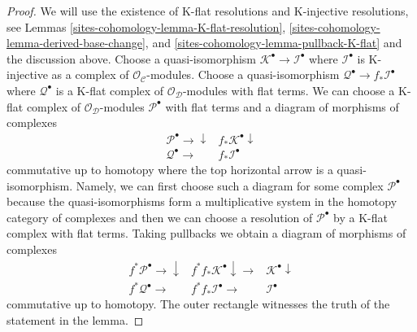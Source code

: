 \begin{proof}
We will use the existence of K-flat resolutions and
K-injective resolutions, see Lemmas
\ref{sites-cohomology-lemma-K-flat-resolution}, \ref{sites-cohomology-lemma-derived-base-change}, and
\ref{sites-cohomology-lemma-pullback-K-flat} and the discussion above.
Choose a quasi-isomorphism
$\mathcal{K}^\bullet \to \mathcal{I}^\bullet$ where $\mathcal{I}^\bullet$
is K-injective as a complex of $\mathcal{O}_\mathcal{C}$-modules.
Choose a quasi-isomorphism $\mathcal{Q}^\bullet \to f_*\mathcal{I}^\bullet$
where $\mathcal{Q}^\bullet$ is a K-flat complex of
$\mathcal{O}_\mathcal{D}$-modules with flat terms.
We can choose a K-flat complex of
$\mathcal{O}_\mathcal{D}$-modules $\mathcal{P}^\bullet$ with flat terms
and a diagram of morphisms of complexes
$$
\begin{array}{cc}\mathcal{P}^\bullet \longrightarrow\downarrow & f_*\mathcal{K}^\bullet \downarrow \\ \mathcal{Q}^\bullet \longrightarrow & f_*\mathcal{I}^\bullet\end{array}
$$
commutative up to homotopy where the top horizontal arrow
is a quasi-isomorphism. Namely, we can first choose such a
diagram for some complex $\mathcal{P}^\bullet$ because
the quasi-isomorphisms form a multiplicative system in
the homotopy category of complexes and then we can choose
a resolution of $\mathcal{P}^\bullet$ by a K-flat complex with flat terms.
Taking pullbacks we obtain a diagram of morphisms of complexes
$$
\begin{array}{ccc}f^*\mathcal{P}^\bullet \longrightarrow\downarrow & f^*f_*\mathcal{K}^\bullet \downarrow\longrightarrow & \mathcal{K}^\bullet \downarrow \\ f^*\mathcal{Q}^\bullet \longrightarrow & f^*f_*\mathcal{I}^\bullet \longrightarrow & \mathcal{I}^\bullet\end{array}
$$
commutative up to homotopy. The outer rectangle witnesses the
truth of the statement in the lemma.
\end{proof}


